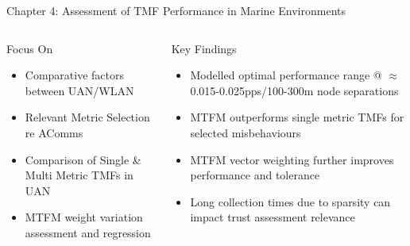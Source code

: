 \documentclass[aspectratio=169]{beamer}
\begin{document}
\begin{frame}{Chapter 4: Assessment of TMF Performance in Marine Environments}
  \begin{columns}
    \begin{column}{0.5\textwidth}
      \begin{block}{Focus On}
        \begin{itemize}
          \item Comparative factors between UAN/WLAN
	      \item Relevant Metric Selection re AComms
          \item Comparison of Single \& Multi Metric TMFs in UAN
          \item MTFM weight variation assessment and regression
        \end{itemize}
      \end{block}
    \end{column}
    \begin{column}{0.5\textwidth}
      \begin{exampleblock}{Key Findings}
        \begin{itemize}
          \item Modelled optimal performance range @ $\approx$0.015-0.025pps/100-300m node separations \hyperlink{fig:2d_normed_product}{}
          \item MTFM outperforms single metric TMFs for selected misbehaviours \hyperlink{fig:otmf_beta_comparison_boxes}{}
          \item MTFM vector weighting further improves performance and tolerance \hyperlink{fig:all_mobile_badmouthing}{}
          \item Long collection times due to sparsity can impact trust assessment relevance

        \end{itemize}
      \end{exampleblock}
    \end{column}
  \end{columns}

\end{frame}
\end{document}
